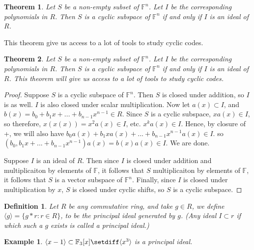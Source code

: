 \documentclass{article}
\newtheorem{thm}{Theorem}
\newtheorem{defn}{Definition}
\newtheorem{eg}{Example}
\begin{document}
\begin{thm}
    Let $S$ be a non-empty subset of $\mathbb{F}^n$. Let $I$
    be the corresponding polynomials in $R$. Then $S$ is a cyclic
    subspace of $\mathbb{F}^n$ if and only if $I$ is an ideal of $R$.
\end{thm}

This theorem give us access to a lot of tools to study cyclic codes.

\begin{thm}
    Let $S$ be a non-empty subset of $\mathbb{F}^n$. Let $I$ be the
    corresponding polynomials in $R$. Then $S$ is a cyclic subspace of $\mathbb{F}^n$
    if and only if $I$ is an ideal of $R$. This theorem will give us access to a
    lot of tools to study cyclic codes.
\end{thm}

\begin{proof}
    Suppose $S$ is a cyclic subspace of $\mathbb{F}^n$. Then $S$ is closed under
    addition, so $I$ is as well. $I$ is also closed under scalar multiplication.
    Now let $a(x) \subset I$, and $b(x) = b_0 + b_1x + ... + b_{n-1}x^{n-1}\in R$.
    Since $S$ is a cyclic subspace, $xa(x)\in I$, so therefore,
    $x(x(x)) = x^2a(x)\in I$, etc. $x^ka(x)\in I$. Hence, by closure of +,
    we will also have $b_0a(x) + b_1xa(x) + ... + b_{n-1}x^{n-1}a(x)\in I$.
    so $(b_0, b_1x+ ... + b_{n-1}x^{n-1})a(x) = b(x)a(x) \in I$. We are done.

    Suppose $I$ is an ideal of $R$. Then since $I$ is closed under addition and
    multiplicaiton by elements of $\mathbb{F}$, it follows that $S$ multiplicaiton
    by elements of $\mathbb{F}$, it follows that $S$ is a vector subspace of
    $\mathbb{F}^n$. Finally, since $I$ is closed under multiplication by $x$,
    $S$ is closed under cyclic shifts, so $S$ is a cyclic subspace.
\end{proof}

\begin{defn}
    Let $R$ be any commutative ring, and take $g\in R$, we define
    $\langle g \rangle = \{g*r: r\in R\}$, to be the principal ideal
    generated by $g$. (Any ideal $I\subset r$ if which such a $g$
    exists is called a principal ideal.)
\end{defn}

\begin{eg}
    $\langle x-1 \rangle \subset \mathbb{F}_3[x]\setdiff \langle x^3\rangle$
    is a principal ideal.
\end{eg}
\end{document}
